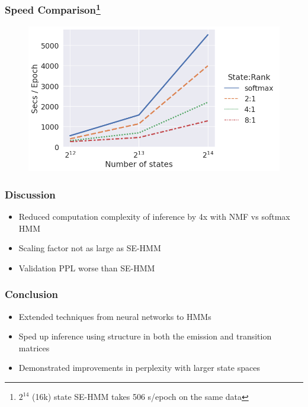\documentclass{beamer}
\begin{document}
\begin{frame}
\frametitle{Speed Comparison\footnote{$2^{14}$ (16k) state SE-HMM takes 506 s/epoch on the same data}}
\begin{center}
\begin{figure}
\includegraphics[width=\textwidth]{img/lhmm-states-features-speed.png}
\end{figure}
\end{center}
\end{frame}

\begin{frame}
\frametitle{Discussion}
\begin{itemize}
\item Reduced computation complexity of inference by 4x with NMF vs softmax HMM
\vspace{2em}
\item Scaling factor not as large as SE-HMM
\vspace{2em}
\item Validation PPL worse than SE-HMM
\end{itemize}
\end{frame}

\begin{frame}
\frametitle{Conclusion}
\begin{itemize}
\item Extended techniques from neural networks to HMMs
\vspace{2em}
\item Sped up inference using structure in both the emission and transition matrices
\vspace{2em}
\item Demonstrated improvements in perplexity with larger state spaces
\end{itemize}
\end{frame}
\end{document}

